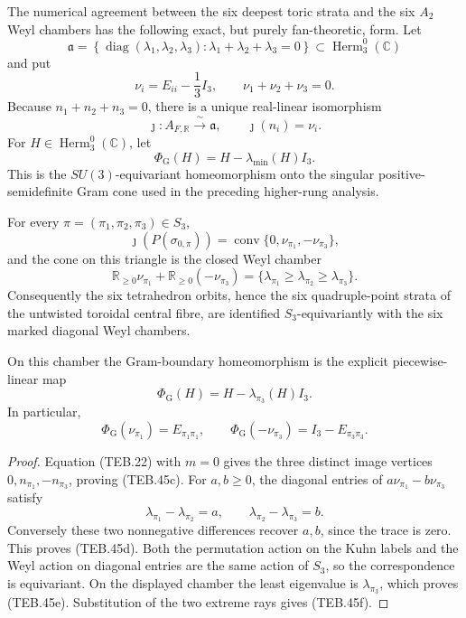 The numerical agreement between the six deepest toric strata and the six
\(A_2\) Weyl chambers has the following exact, but purely
fan-theoretic, form.  Let
\[
 \mathfrak a=
 \left\{\operatorname{diag}(\lambda_1,\lambda_2,\lambda_3):
 \lambda_1+\lambda_2+\lambda_3=0\right\}
 \subset\operatorname{Herm}_3^0(\mathbb C)
\]
and put
\[
 \nu_i=E_{ii}-\frac13I_3,\qquad
 \nu_1+\nu_2+\nu_3=0.                                  \tag{TEB.45a}
\]
Because \(n_1+n_2+n_3=0\), there is a unique real-linear isomorphism
\[
 \jmath:A_{F,\mathbb R}\xrightarrow{\ \sim\ }\mathfrak a,
 \qquad \jmath(n_i)=\nu_i.                             \tag{TEB.45b}
\]
For \(H\in\operatorname{Herm}_3^0(\mathbb C)\), let
\[
 \Phi_{\mathrm G}(H)=H-\lambda_{\min}(H)I_3.
\]
This is the \(SU(3)\)-equivariant homeomorphism onto the singular
positive-semidefinite Gram cone used in the preceding higher-rung analysis.

\begin{proposition}
\label{prop:teb-weyl-chambers}
For every \(\pi=(\pi_1,\pi_2,\pi_3)\in S_3\),
\[
 \jmath\!\left(P(\sigma_{0,\pi})\right)
 =
 \operatorname{conv}
 \{0,\nu_{\pi_1},-\nu_{\pi_3}\},                       \tag{TEB.45c}
\]
and the cone on this triangle is the closed Weyl chamber
\[
 \boxed{
 \mathbb R_{\geq0}\nu_{\pi_1}
 +\mathbb R_{\geq0}(-\nu_{\pi_3})
 =
 \{\lambda_{\pi_1}\geq\lambda_{\pi_2}
                  \geq\lambda_{\pi_3}\}.}              \tag{TEB.45d}
\]
Consequently the six tetrahedron orbits, hence the six quadruple-point
strata of the untwisted toroidal central fibre, are identified
\(S_3\)-equivariantly with the six marked diagonal Weyl chambers.

On this chamber the Gram-boundary homeomorphism is the explicit
piecewise-linear map
\[
 \Phi_{\mathrm G}(H)=H-\lambda_{\pi_3}(H)I_3.          \tag{TEB.45e}
\]
In particular,
\[
 \Phi_{\mathrm G}(\nu_{\pi_1})=E_{\pi_1\pi_1},
 \qquad
 \Phi_{\mathrm G}(-\nu_{\pi_3})=I_3-E_{\pi_3\pi_3}.    \tag{TEB.45f}
\]
\end{proposition}

\begin{proof}
Equation (TEB.22) with \(m=0\) gives the three distinct image vertices
\(0,n_{\pi_1},-n_{\pi_3}\), proving (TEB.45c).  For
\(a,b\geq0\), the diagonal entries of
\(a\nu_{\pi_1}-b\nu_{\pi_3}\) satisfy
\[
 \lambda_{\pi_1}-\lambda_{\pi_2}=a,\qquad
 \lambda_{\pi_2}-\lambda_{\pi_3}=b.
\]
Conversely these two nonnegative differences recover \(a,b\), since the
trace is zero.  This proves (TEB.45d).  Both the permutation action on the
Kuhn labels and the Weyl action on diagonal entries are the same action of
\(S_3\), so the correspondence is equivariant.  On the displayed chamber
the least eigenvalue is \(\lambda_{\pi_3}\), which proves (TEB.45e).
Substitution of the two extreme rays gives (TEB.45f).
\end{proof}

